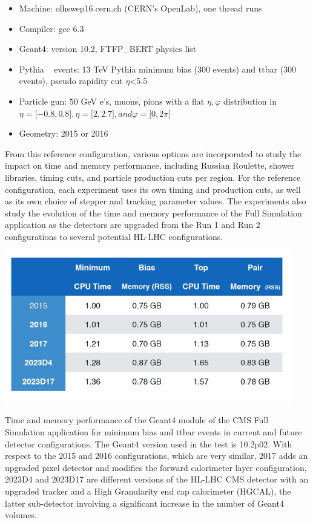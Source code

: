 \documentclass[12pt,a4paper]{article}
\begin{document}
{\begin{itemize}
\item
  Machine: olhswep16.cern.ch (CERN's OpenLab), one thread runs
\end{itemize}

\begin{itemize}
\item
  Compiler: gcc 6.3
\item
  Geant4: version 10.2, FTFP\_BERT physics list
\item
  Pythia ~\cite{Sjostrand:2014zea} events: 13 TeV Pythia minimum bias (300 events) and
  ttbar (300 events), pseudo rapidity cut \textbar{}$\eta$\textbar{}\textless{}5.5
\item
  Particle gun: 50 GeV e's, muons, pions with a flat $\eta,\varphi$ distribution in
  $\eta={[}-0.8,0.8{]}, \eta={[}2,2.7{]}, and \varphi= {[}0,2\pi{]}$
\item
  Geometry: 2015 or 2016
\end{itemize}

From this reference configuration, various options are incorporated to
study the impact on time and memory performance, including Russian
Roulette, shower libraries, timing cuts, and particle production cuts
per region. For the reference configuration, each experiment uses its
own timing and production cuts, as well as its own choice of stepper and
tracking parameter values. The experiments also study the evolution of
the time and memory performance of the Full Simulation application as
the detectors are upgraded from the Run 1 and Run 2 configurations to
several potential HL-LHC configurations.

\begin{table}[bthp]
\vspace*{0.3cm}
\centering
\includegraphics[width=0.94\textwidth]{image15.png}
\caption{Time and memory performance of the Geant4 module of the
CMS Full Simulation application for minimum bias and ttbar events in
current and future detector configurations. The Geant4 version used in
the test is 10.2p02. With respect to the 2015 and 2016 configurations,
which are very similar, 2017 adds an upgraded pixel detector and
modifies the forward calorimeter layer configuration, 2023D4 and 2023D17
are different versions of the HL-LHC CMS detector with an upgraded
tracker and a High Granularity end cap calorimeter (HGCAL), the latter
sub-detector involving a significant increase in the number of Geant4
volumes. }
\label{label:table1}
\end{table}

}
\end{document}

